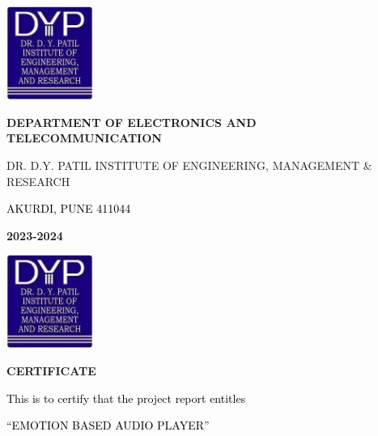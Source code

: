 \documentclass[a4paper]{article}
\begin{document}
\bigskip



\begin{center}
\includegraphics[width=1.1165in,height=1.2in]{rahulop-img002.jpg}
\end{center}

\bigskip


\bigskip

{\centering
\textbf{DEPARTMENT OF ELECTRONICS AND TELECOMMUNICATION}
\par}


\bigskip

{\centering
DR. D.Y. PATIL INSTITUTE OF ENGINEERING, MANAGEMENT \& RESEARCH
\par}

{\centering
\textcolor{black}{AKURDI, PUNE 411044}
\par}


\bigskip


\bigskip

{\centering
\textbf{2023-2024}
\par}

\clearpage\setcounter{page}{2}\pagestyle{Convertedi}

\bigskip

 \includegraphics[width=1.1181in,height=1.2in]{rahulop-img003.jpg} 


\bigskip

{\centering
\textbf{CERTIFICATE}
\par}


\bigskip

{\centering
\textcolor{black}{This is to certify that the project report entitles}
\par}


\bigskip

{\centering
\textcolor{black}{{}``EMOTION BASED AUDIO PLAYER''}
\par}
\end{document}
